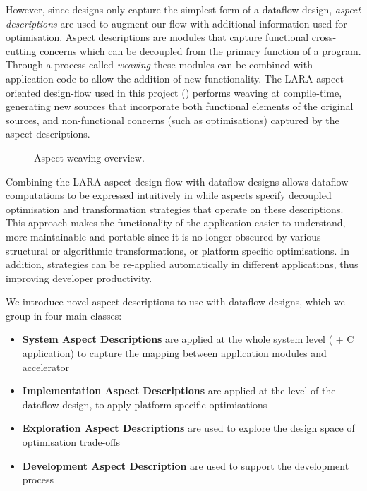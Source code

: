 \label{sec:aspects}

However, since \FAST{} designs only capture the simplest form of a
dataflow design, \emph{aspect descriptions} are used to augment our
flow with additional information used for optimisation. Aspect
descriptions are modules that capture functional cross-cutting
concerns which can be decoupled from the primary function of a
program. Through a process called \emph{weaving} these modules can be
combined with application code to allow the addition of new
functionality. The LARA aspect-oriented design-flow
\cite{Cardoso:Carvalho:Cutinho:Luk:Nobre:Diniz:Petrov:2012} used in
this project () performs weaving at
compile-time, generating new sources that incorporate both functional
elements of the original sources, and non-functional concerns (such as
optimisations) captured by the aspect descriptions.

\begin{figure}[!ht]
  \centering
  \def\svgwidth{0.9\textwidth}
  
  \caption{Aspect weaving overview.}
  \label{fig:aspect-weaving}
\end{figure}

Combining the LARA aspect design-flow with \FAST{} dataflow designs
allows dataflow computations to be expressed intuitively in \FAST{}
while aspects specify decoupled optimisation and transformation
strategies that operate on these descriptions. This approach makes the
functionality of the application easier to understand, more
maintainable and portable since it is no longer obscured by various
structural or algorithmic transformations, or platform specific
optimisations. In addition, strategies can be re-applied automatically
in different applications, thus improving developer productivity.

We introduce novel aspect descriptions to use with \FAST{} dataflow
designs, which we group in four main classes:

\begin{itemize}
\item \textbf{System Aspect Descriptions} are applied at the whole
  system level (\FAST{} + C application) to capture the mapping
  between application modules and accelerator
\item \textbf{Implementation Aspect Descriptions} are applied at the
  level of the dataflow design, to apply platform specific
  optimisations
\item \textbf{Exploration Aspect Descriptions} are used to explore the
  design space of optimisation trade-offs
\item \textbf{Development Aspect Description} are used to support
  the development process
\end{itemize}

